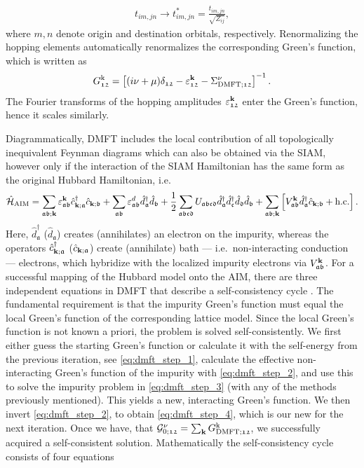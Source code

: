 \documentclass[../../main.tex]{subfiles}
\begin{document}
\begin{align}
	t_{im,jn}\to t_{im,jn}^{*}=\frac{t_{im,jn}}{\sqrt{Z_{ij}}},
\end{align}
where $m,n$ denote origin and destination orbitals, respectively. Renormalizing the hopping elements automatically renormalizes the corresponding Green's function, which is written as
\begin{align}
	G_{\mathfrak{12}}^{\text{k}}=\left [(i\nu+\mu)\delta_{\mathfrak{12}}-\varepsilon^{\textbf{k}}_{\mathfrak{12}}-\Sigma_{\text{DMFT};\mathfrak{12}}^{\nu}\right ]^{-1}.
\end{align}
The Fourier transforms of the hopping amplitudes $\varepsilon^{\textbf{k}}_{\mathfrak{12}}$ enter the Green's function, hence it scales similarly.

Diagrammatically, DMFT includes the local contribution of all topologically inequivalent Feynman diagrams which can also be obtained via the SIAM, however only if the interaction of the SIAM Hamiltonian has the same form as the original Hubbard Hamiltonian, i.e.\ 
\begin{align}
	\hat{\mathcal{H}}_{\text{AIM}}=\sum_{\mathfrak{ab};\textbf{k}}\varepsilon^{\textbf{k}}_{\mathfrak{ab}}\hat c^{\dagger}_{\textbf{k};\mathfrak{a}}\hat c_{\textbf{k};\mathfrak{b}}+\sum_{\mathfrak{ab}}\varepsilon^d_{\mathfrak{ab}}\hat d^\dagger_{\mathfrak{a}}\hat d_{\mathfrak{b}}+\frac12\sum_{\mathfrak{abcd}}U_{\mathfrak{abcd}}\hat d_{\mathfrak{a}}^{\dagger}\hat d_{\mathfrak{c}}^{\dagger} \hat d_{\mathfrak{d}} \hat d_{\mathfrak{b}}+\sum_{\mathfrak{ab};\textbf{k}} \left [V^{\textbf{k}}_{\mathfrak{ab}} \hat d_{\mathfrak{a}}^{\dagger}\hat c_{\textbf{k};\mathfrak{b}}+\text{h.c.}\right ].
\end{align}
Here, $\hat d^{\dagger}_{\mathfrak{a}}$ ($\hat d_{\mathfrak{a}}$) creates (annihilates) an electron on the impurity, whereas the operators $\hat c^{\dagger}_{\textbf{k};\mathfrak{a}}$ ($\hat c_{\textbf{k};\mathfrak{a}}$) create (annihilate) bath --- i.e.\ non-interacting conduction --- electrons, which hybridize with the localized impurity electrons via $V^{\textbf{k}}_{\mathfrak{ab}}$. For a successful mapping of the Hubbard model onto the AIM, there are three independent equations in DMFT that describe a self-consistency cycle \cite{Held2007}. The fundamental requirement is that the impurity Green's function must equal the local Green's function of the corresponding lattice model. Since the local Green's function is not known a priori, the problem is solved self-consistently. We first either guess the starting Green's function or calculate it with the self-energy from the previous iteration, see \eqref{eq:dmft_step_1}, calculate the effective non-interacting Green's function of the impurity with \eqref{eq:dmft_step_2}, and use this to solve the impurity problem in \eqref{eq:dmft_step_3} (with any of the methods previously mentioned). This yields a new, interacting Green's function. We then invert \eqref{eq:dmft_step_2}, to obtain \eqref{eq:dmft_step_4}, which is our new  for the next iteration. Once we have, that $\mathcal{G}^{\nu}_{0;\mathfrak{12}}=\sum_{\textbf{k}} G^{\text{k}}_{\text{DMFT};\mathfrak{12}}$, we successfully acquired a self-consistent solution. Mathematically the self-consistency cycle consists of four equations
\end{document}
